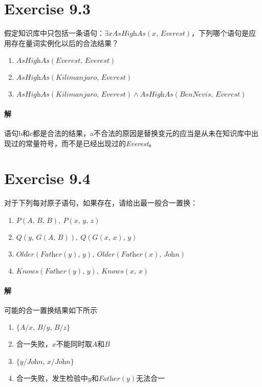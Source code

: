 \documentclass{article}
\begin{document}
\section{Exercise 9.3}
假定知识库中只包括一条语句：$\exists x \textit{AsHighAs}(x,\, \textit{Everest})$，下列哪个语句是应用存在量词实例化以后的合法结果？
\begin{enumerate}[label = \emph{\alph*}.]
    \item $\textit{AsHighAs}(\textit{Everest},\, \textit{Everest})$
    \item $\textit{AsHighAs}(\textit{Kilimanjaro},\, \textit{Everest})$
    \item $\textit{AsHighAs}(\textit{Kilimanjaro},\, \textit{Everest}) \land \textit{AsHighAs}(\textit{BenNevis},\, \textit{Everest})$
\end{enumerate}

\paragraph{解}
语句b和c都是合法的结果，a不合法的原因是替换变元的应当是从未在知识库中出现过的常量符号，而不是已经出现过的\textit{Everest}。

\section{Exercise 9.4}
对于下列每对原子语句，如果存在，请给出最一般合一置换：
\begin{enumerate}[label = \emph{\alph*}.]
    \item $P(A,\, B,\, B),\ P(x,\, y,\, z)$
    \item $Q(y,\, G(A,\, B)),\ Q(G(x,\, x),\, y)$
    \item $\textit{Older}(\textit{Father}(y),\, y),\ \textit{Older}(\textit{Father}(x),\, \textit{John})$
    \item $\textit{Knows}(\textit{Father}(y),\, y),\ \textit{Knows}(x,\, x)$
\end{enumerate}

\paragraph{解}
可能的合一置换结果如下所示
\begin{enumerate}[label = \emph{\alph*}.]
    \item $\{A/x,\, B/y,\, B/z\}$
    \item 合一失败，$x$不能同时取$A$和$B$
    \item $\{y/\textit{John},\, x/\textit{John}\}$
    \item 合一失败，发生检验中$y$和$\textit{Father}(y)$无法合一
\end{enumerate}
\end{document}
